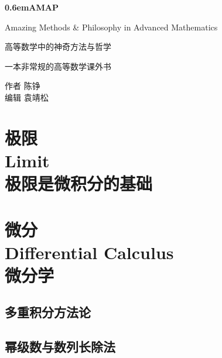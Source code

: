 \documentclass{ctexbook}
\begin{document}
\clearpage
\newcommand\nbvspace[1][3]{\vspace*{\stretch{#1}}}
\newcommand\nbstretchyspace{\spaceskip0.5em plus 0.25em minus 0.25em}
\newcommand{\nbtitlestretch}{\spaceskip0.6em}
\pagestyle{empty}
\begin{center}
\bfseries
\nbvspace[1]
\Huge
{\nbtitlestretch\huge AMAP}

\nbvspace[1]
\normalsize

Amazing Methods \& Philosophy in Advanced Mathematics

\Large 高等数学中的神奇方法与哲学

\nbvspace[2]

\normalsize 一本非常规的高等数学课外书

\nbvspace[1]
\small 作者 \Large 陈铮\\[0.5em]
\small 编辑 {\large 袁靖松}
\normalsize


\end{center}

\tableofcontents

\part[极限]{极限 \\ Limit \\ 
    {\normalsize 极限是微积分的基础}
}


\part[微分]{微分 \\ Differential Calculus \\
    {\normalsize 微分学}
}




\chapter{多重积分方法论}

\chapter{幂级数与数列长除法}
\end{document}

